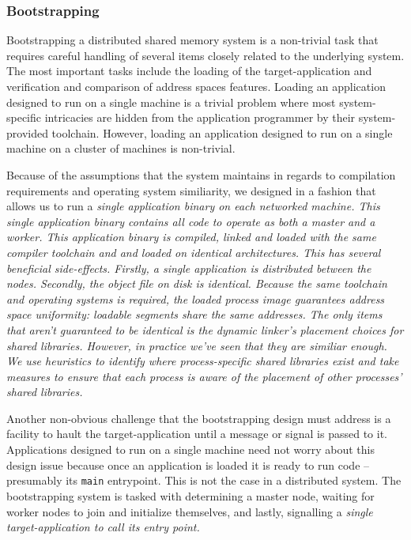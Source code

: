 \subsubsection{Bootstrapping}
Bootstrapping a distributed shared memory system is a non-trivial task that requires careful handling of several items closely related to the underlying system.  The most important tasks include the loading of the target-application and verification and comparison of address spaces features.  Loading an application designed to run on a single machine is a trivial problem where most system-specific intricacies are hidden from the application programmer by their system-provided toolchain.  However, loading an application designed to run on a single machine on a cluster of machines is non-trivial.

Because of the assumptions that the \projname{} system maintains in regards to compilation requirements and operating system similiarity, we designed \projname{} in a fashion that allows us to run a \em single \em application binary on each networked machine.  This \em single \em application binary contains all code to operate as both a master and a worker.  This application binary is compiled, linked and loaded with the same compiler toolchain and and loaded on identical architectures.  This has several beneficial side-effects.  Firstly, a single application is distributed between the nodes.  Secondly, the object file on disk is identical.  Because the same toolchain and operating systems is required, the loaded process image guarantees address space uniformity: loadable segments share the same addresses.  The only items that aren't guaranteed to be identical is the dynamic linker's placement choices for shared libraries.  However, in practice we've seen that they are similiar enough.  We use heuristics to identify where process-specific shared libraries exist and take measures to ensure that each process is aware of the placement of other processes' shared libraries.

Another non-obvious challenge that the bootstrapping design must address is a facility to hault the target-application until a message or signal is passed to it.  Applications designed to run on a single machine need not worry about this design issue because once an application is loaded it is ready to run code -- presumably its \verb,main, entrypoint.  This is not the case in a distributed system.  The \projname{} bootstrapping system is tasked with determining a master node, waiting for worker nodes to join and initialize themselves, and lastly, signalling a \em single \em target-application to call its entry point.

